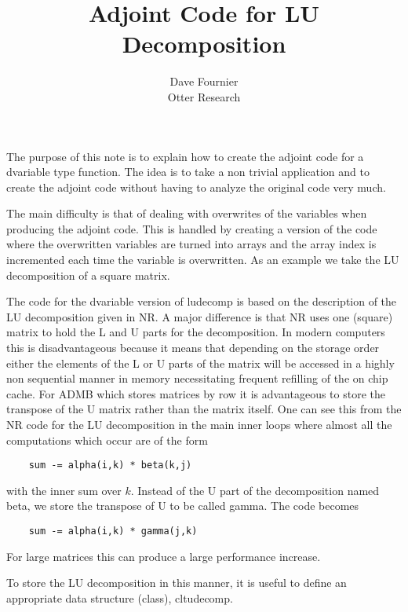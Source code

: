 \documentclass[12pt,letterpaper]{report}
\title{Adjoint Code for LU Decomposition}
\author{Dave Fournier\\
Otter Research}
\newcommand\help[1]{\color{red}{\it #1 }\normalcolor}
\newcommand\doublespacing{\baselineskip=1.6\normalbaselineskip}
\begin{document}
\maketitle
\doublespacing

The purpose of this note is to explain how to create the adjoint code
for a dvariable type function. The idea is to take a non trivial application
and to create the adjoint code without having to analyze the original code
very much.

The main difficulty is that of dealing with overwrites of the variables when
producing the adjoint code. This is handled by creating a version of the
code where the overwritten variables are turned into arrays and the array 
index is incremented each time the variable is overwritten. As an 
example we take the LU decomposition of a square matrix.

The code for the dvariable version of ludecomp is based on the description of
the LU decomposition given in NR. A major difference is that NR uses one
(square) matrix to hold the L and U parts for the decomposition. 
In modern computers this is disadvantageous because it means that depending 
on the storage order either the elements of the L or U parts of the matrix 
will be accessed in a highly non sequential manner in memory necessitating 
frequent refilling of the on chip cache. For ADMB which stores matrices by 
row it is advantageous to store the transpose of the U matrix rather than the 
matrix itself.  One can see this from the NR code for the LU decomposition
in the main inner loops where almost all the computations which occur are 
of the form 
\begin{verbatim}
    sum -= alpha(i,k) * beta(k,j)
\end{verbatim}

\noindent with the inner sum over $k$.  Instead of the U part of the decomposition 
named beta, we store the transpose of U to be called gamma. The code becomes

\begin{verbatim}
    sum -= alpha(i,k) * gamma(j,k)
\end{verbatim}

For large matrices this can produce a large performance increase.
\help{because?}

To store the LU decomposition in this manner, it is useful to define
an appropriate data structure (class), cltudecomp.
\end{document}
